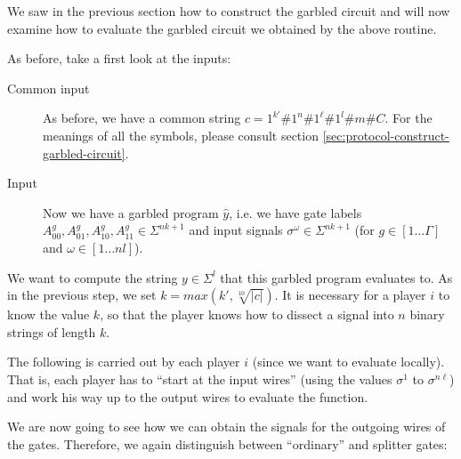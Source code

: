 \message{ !name(seminar.tex)}\documentclass{llncs}
\begin{document}
We saw in the previous section how to construct the garbled circuit and will now examine how to evaluate the garbled circuit we obtained by the above routine.

As before, take a first look at the inputs:

\begin{description}
\item[Common input] As before, we have a common string $c=1^{k'}\#1^n\#1^\ell\#1^l\#m\#C$. For the meanings of all the symbols, please consult section \ref{sec:protocol-construct-garbled-circuit}.
\item[Input] Now we have a garbled program $\hat y$, i.e. we have gate labels $A^g_{00}, A^g_{01}, A^g_{10}, A^g_{11}\in\Sigma^{nk+1}$ and input signals $\sigma^\omega\in\Sigma^{nk+1}$ (for $g\in[1\dots\Gamma]$ and $\omega\in[1\dots nl]$).
\end{description}

We want to compute the string $y\in\Sigma^l$ that this garbled program evaluates to. As in the previous step, we set $k=max(k',\sqrt[10]{|c|})$. It is necessary for a player $i$ to know the value $k$, so that the player knows how to dissect a signal into $n$ binary strings of length $k$.

The following is carried out by each player $i$ (since we want to evaluate locally). That is, each player has to ``start at the input wires'' (using the values $\sigma^1$ to $\sigma^{n\ell}$) and work his way up to the output wires to evaluate the function.

We are now going to see how we can obtain the signals for the outgoing wires of the gates. Therefore, we again distinguish between ``ordinary'' and splitter gates:
\end{document}
